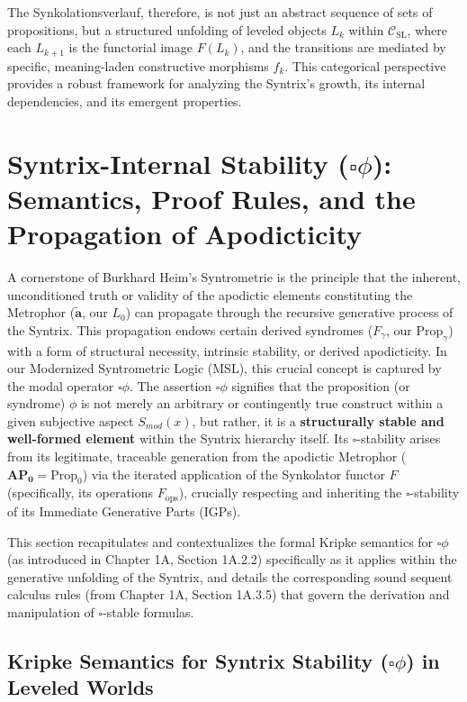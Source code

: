 \documentclass[
    12pt,              %
    a4paper,           %
    headings=normal,   %
    twoside=true,      %
    BCOR=8mm,          %
]{scrbook}
\newcommand{\metrophor}{\bm{\widetilde{a}}}
\newcommand{\syndrom}{F}
\newcommand{\BoxSyn}{\square}
\newcommand{\APZero}{\mathbf{AP_0}}
\newcommand{\Propk}[1]{\text{Prop}_{#1}}
\newcommand{\fops}{F_{\text{ops}}}
\begin{document}
The Synkolationsverlauf, therefore, is not just an abstract sequence of sets of propositions, but a structured unfolding of leveled objects \(L_k\) within \(\mathcal{C}_{\text{SL}}\), where each \(L_{k+1}\) is the functorial image \(F(L_k)\), and the transitions are mediated by specific, meaning-laden constructive morphisms \(f_k\). This categorical perspective provides a robust framework for analyzing the Syntrix's growth, its internal dependencies, and its emergent properties.

\section{Syntrix-Internal Stability (\(\BoxSyn \phi\)): Semantics, Proof Rules, and the Propagation of Apodicticity}
\label{sec:ch2_syntrix_internal_stability} 

A cornerstone of Burkhard Heim's Syntrometrie is the principle that the inherent, unconditioned truth or validity of the apodictic elements constituting the Metrophor (\(\metrophor\), our \(L_0\)) can propagate through the recursive generative process of the Syntrix. This propagation endows certain derived syndromes (\(\syndrom_\gamma\), our \(\Propk{\gamma}\)) with a form of structural necessity, intrinsic stability, or derived apodicticity. In our Modernized Syntrometric Logic (MSL), this crucial concept is captured by the modal operator \textbf{\(\BoxSyn \phi\)}. The assertion \(\BoxSyn \phi\) signifies that the proposition (or syndrome) \(\phi\) is not merely an arbitrary or contingently true construct within a given subjective aspect \(S_{mod}(x)\), but rather, it is a \textbf{structurally stable and well-formed element} within the Syntrix hierarchy itself. Its \(\BoxSyn\)-stability arises from its legitimate, traceable generation from the apodictic Metrophor (\(\APZero = \Propk{0}\)) via the iterated application of the Synkolator functor \(F\) (specifically, its operations \(\fops\)), crucially respecting and inheriting the \(\BoxSyn\)-stability of its Immediate Generative Parts (IGPs).

This section recapitulates and contextualizes the formal Kripke semantics for \(\BoxSyn \phi\) (as introduced in Chapter 1A, Section 1A.2.2) specifically as it applies within the generative unfolding of the Syntrix, and details the corresponding sound sequent calculus rules (from Chapter 1A, Section 1A.3.5) that govern the derivation and manipulation of \(\BoxSyn\)-stable formulas.

\subsection{Kripke Semantics for Syntrix Stability (\(\BoxSyn \phi\)) in Leveled Worlds}
\label{sec:ch2_kripke_semantics_stability_syntrix} 
\end{document}
